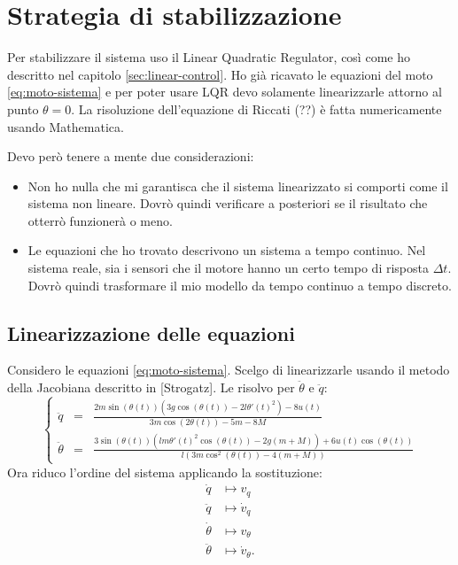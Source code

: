 \section{Strategia di stabilizzazione}
\label{sec:strategia-stabilizzazione}
Per stabilizzare il sistema uso il Linear Quadratic Regulator, così come ho descritto nel capitolo \ref{sec:linear-control}. Ho già ricavato le equazioni del moto \eqref{eq:moto-sistema} e per poter usare LQR devo solamente linearizzarle attorno al punto $\theta = 0$. La risoluzione dell'equazione di Riccati (??)  è fatta numericamente usando Mathematica.

Devo però tenere a mente due considerazioni:
\begin{itemize}
    \item Non ho nulla che mi garantisca che il sistema linearizzato si comporti come il sistema non lineare. Dovrò quindi verificare a posteriori se il risultato che otterrò funzionerà o meno. 

    \item Le equazioni che ho trovato descrivono un sistema a tempo continuo. Nel sistema reale, sia i sensori che il motore hanno un certo tempo di risposta $\Delta t$. Dovrò quindi trasformare il mio modello da tempo continuo a tempo discreto.
\end{itemize}

\subsection{Linearizzazione delle equazioni}
Considero le equazioni \eqref{eq:moto-sistema}. Scelgo di linearizzarle usando il metodo della Jacobiana descritto in [Strogatz]. Le risolvo per $\ddot \theta$ e $\ddot q$:
\begin{equation*}
    \left\{
    \begin{aligned}
        \ddot q &= &\frac{2m\sin(\theta(t))\left(3g\cos(\theta(t))-2l\theta'(t)^2\right)-8u(t)} {3m\cos(2\theta(t))-5m-8M} \\
        \ddot \theta &= &\frac{3\sin(\theta(t))\left(lm\theta'(t)^2\cos(\theta(t))-2g(m+M)\right)+6u(t)\cos(\theta(t))}{l\left(3m\cos^2(\theta(t))-4(m+M)\right)}
    \end{aligned}
    \right.
\end{equation*}
Ora riduco l'ordine del sistema applicando la sostituzione:
\begin{align}
    \dot q &\mapsto v_q \\
    \ddot q &\mapsto \dot v_q \\
    \dot \theta &\mapsto v_\theta \\
    \ddot \theta &\mapsto \dot v_\theta.
\end{align}

